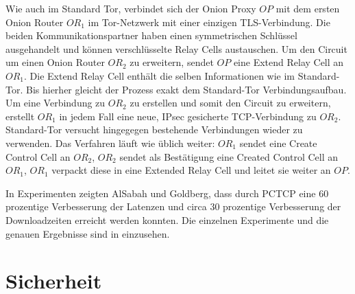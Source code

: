 \documentclass[fleqn,envcountsame,runningheads,10pt,a4paper]{llncs}
\begin{document}
Wie auch im Standard Tor, verbindet sich der Onion Proxy $\textit{OP}$ mit dem 
ersten Onion Router $\textit{OR}_1$ im Tor-Netzwerk mit einer einzigen 
TLS-Verbindung. Die beiden Kommunikationspartner haben einen symmetrischen 
Schlüssel ausgehandelt und können verschlüsselte Relay Cells austauschen. Um den 
Circuit um einen Onion Router $\textit{OR}_2$ zu erweitern, sendet $\textit{OP}$ 
eine Extend Relay Cell an $\textit{OR}_1$. Die Extend Relay Cell enthält die 
selben Informationen wie im Standard-Tor. Bis hierher gleicht der Prozess exakt 
dem Standard-Tor Verbindungsaufbau. Um eine Verbindung zu $\textit{OR}_2$ zu 
erstellen und somit den Circuit zu erweitern, erstellt $\textit{OR}_1$ in jedem 
Fall eine neue, IPsec gesicherte TCP-Verbindung zu $\textit{OR}_2$. Standard-Tor 
versucht hingegegen bestehende Verbindungen wieder zu verwenden. Das Verfahren 
läuft wie üblich weiter: $\textit{OR}_1$ sendet eine Create Control Cell an 
$\textit{OR}_2$, $\textit{OR}_2$ sendet als Bestätigung eine Created Control 
Cell an $\textit{OR}_1$, $\textit{OR}_1$ verpackt diese in eine Extended Relay 
Cell und leitet sie weiter an $\textit{OP}$.

In Experimenten zeigten AlSabah und Goldberg, dass durch PCTCP eine 60 
prozentige Verbesserung der Latenzen und circa 30 prozentige Verbesserung der 
Downloadzeiten erreicht werden konnten. Die einzelnen Experimente und die 
genauen Ergebnisse sind in \cite{pctcp} einzusehen.

\section{Sicherheit}\label{sec:discussion}

\end{document}

